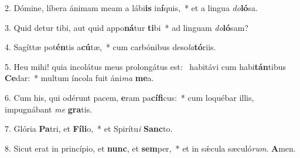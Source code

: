 2. Dómine, líbera ánimam meam a lábi\textbf{is} in\textbf{í}quis,~*  et a lingua \textit{do}\textbf{ló}sa.\

3. Quid detur tibi, aut quid appo\textbf{ná}tur \textbf{ti}bi~*  ad linguam \textit{do}\textbf{ló}sam?\

4. Sagíttæ pot\textbf{én}tis a\textbf{cú}tæ,~*  cum carbónibus deso\textit{la}\textbf{tó}riis.\

5. Heu mihi! quia incolátus meus prolongátus est: \dag\  habitávi cum habi\textbf{tán}tibus \textbf{Ce}dar:~*  multum íncola fuit áni\textit{ma} \textbf{me}a.\

6. Cum his, qui odérunt pacem, \textbf{e}ram pa\textbf{cí}\textbf{fi}cus:~*  cum loquébar illis, impugnábant \textit{me} \textbf{gra}tis.\

7. Glória \textbf{Pa}tri, et \textbf{Fí}\textbf{li}o,~*  et Spirítu\textit{i} \textbf{Sanc}to.\

8. Sicut erat in princípio, et \textbf{nunc}, et \textbf{sem}per,~*  et in sǽcula sæculó\textit{rum}. \textbf{A}men.\

